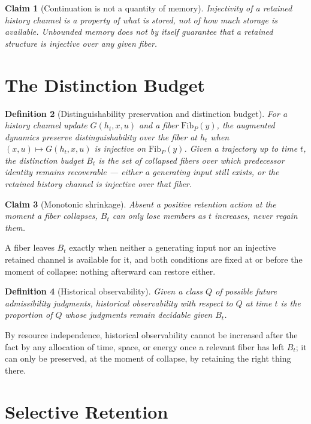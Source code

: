 \documentclass[12pt]{report}
\newtheorem{definition}{Definition}[section]
\newtheorem{claim}[definition]{Claim}
\begin{document}
\begin{claim}[Continuation is not a quantity of memory]
Injectivity of a retained history channel is a property of \emph{what}
is stored, not of \emph{how much} storage is available. Unbounded
memory does not by itself guarantee that a retained structure is
injective over any given fiber.
\end{claim}

\section*{The Distinction Budget}

\begin{definition}[Distinguishability preservation and distinction budget]
For a history channel update $G(h_t,x,u)$ and a fiber $\mathrm{Fib}_P(y)$,
the augmented dynamics preserve distinguishability over the fiber at
$h_t$ when $(x,u) \mapsto G(h_t,x,u)$ is injective on $\mathrm{Fib}_P(y)$.
Given a trajectory up to time $t$, the distinction budget $B_t$ is the
set of collapsed fibers over which predecessor identity remains
recoverable --- either a generating input still exists, or the retained
history channel is injective over that fiber.
\end{definition}

\begin{claim}[Monotonic shrinkage]
Absent a positive retention action at the moment a fiber collapses,
$B_t$ can only lose members as $t$ increases, never regain them.
\end{claim}

A fiber leaves $B_t$ exactly when neither a generating input nor an
injective retained channel is available for it, and both conditions are
fixed at or before the moment of collapse: nothing afterward can restore
either.

\begin{definition}[Historical observability]
Given a class $Q$ of possible future admissibility judgments, historical
observability with respect to $Q$ at time $t$ is the proportion of $Q$
whose judgments remain decidable given $B_t$.
\end{definition}

By resource independence, historical observability cannot be increased
after the fact by any allocation of time, space, or energy once a
relevant fiber has left $B_t$; it can only be preserved, at the moment
of collapse, by retaining the right thing there.

\section*{Selective Retention}
\end{document}
